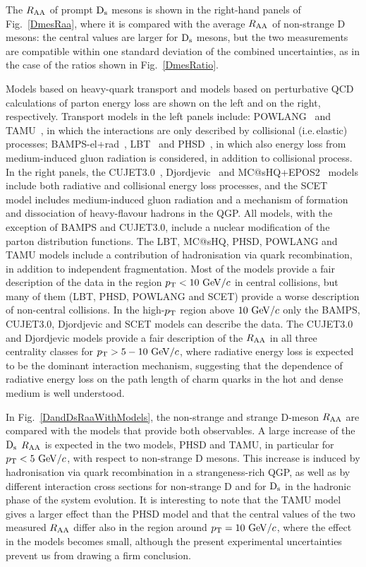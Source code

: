 The $R_{\rm AA}$ of prompt ${\rm D_s}$ mesons is shown in the right-hand panels of Fig.~\ref{DmesRaa},
where it is compared with the average $R_{\rm AA}$ of non-strange D mesons: the central values are
larger for ${\rm D_s}$ mesons, but the two measurements are 
compatible within one standard deviation of the combined uncertainties, as in the case of the ratios shown in Fig.~\ref{DmesRatio}.



Models based on heavy-quark transport and models based on perturbative QCD calculations of parton energy loss are shown on the left and on the right, respectively.
Transport models in the left panels include: POWLANG~\cite{Beraudo:2014boa} and TAMU~\cite{He:2014cla}, in which the interactions are only described by collisional (i.e.\,elastic) processes; 
BAMPS-el+rad~\cite{Uphoff:2014hza}, LBT~\cite{Cao:2017hhk} and PHSD~\cite{Song:2015ykw}, in which also energy loss from medium-induced gluon radiation
is considered, in addition to collisional process.
In the right panels, the CUJET3.0~\cite{Xu:2015bbz}, Djordjevic~\cite{Djordjevic:2015hra} and MC@sHQ+EPOS2~\cite{Nahrgang:2013xaa} models include both radiative and collisional energy loss processes, and
the SCET~\cite{Kang:2016ofv} model includes medium-induced gluon radiation and a mechanism of formation and dissociation of heavy-flavour hadrons in the QGP.
All models, with the exception of BAMPS and CUJET3.0, include a nuclear modification of the parton distribution functions.
The LBT, MC@sHQ, PHSD, POWLANG and TAMU
models include a contribution of hadronisation via quark recombination, in addition to independent fragmentation. 
Most of the models provide a fair description of the data in the region $p_{\rm T}<10~\mathrm{GeV}/c$ in central collisions, 
but many of them (LBT, PHSD, POWLANG and SCET) provide a worse description of non-central collisions.
In the high-$p_{\rm T}$ region above $10~\mathrm{GeV}/c$ only the BAMPS, CUJET3.0, Djordjevic and SCET models can describe the data. The CUJET3.0 and Djordjevic models provide a 
fair description of the $R_{\rm AA}$ in all three centrality classes for $p_{\rm T} > 5-10~\mathrm{GeV}/c$, where radiative energy loss is expected to be the dominant interaction mechanism, suggesting that the dependence of radiative energy loss on the path length of charm quarks in the hot and dense medium is well understood. 

In Fig.~\ref{DandDsRaaWithModels},  the non-strange and strange D-meson $R_{\rm AA}$ are compared with  
the models that provide both observables. A large increase of the ${\rm D_s}$ $R_{\rm AA}$ is expected in the two models, PHSD and TAMU, in particular for $p_{\rm T}<5~\mathrm{GeV}/c$, with respect to non-strange D mesons. This increase is induced by hadronisation via quark recombination in a strangeness-rich QGP, as well as by different 
interaction cross sections for non-strange D and for ${\rm D_s}$ in the hadronic phase of the system evolution. It is interesting  to note that the TAMU model gives a larger effect than the PHSD model and that the central values of the two measured $R_{\rm AA}$ differ also 
in the region around $p_{\rm T}=10~\mathrm{GeV}/c$, where the effect in the models becomes small, although the present experimental uncertainties prevent us from drawing a firm conclusion. 

